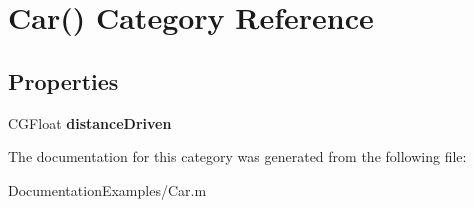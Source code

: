 \hypertarget{category_car_07_08}{}\section{Car() Category Reference}
\label{category_car_07_08}
\subsection*{Properties}
\begin{DoxyCompactItemize}
\item 
\hypertarget{category_car_07_08_a2d6e4a02390f7c55946ced5318b3a4b2}{}C\+G\+Float {\bfseries distance\+Driven}\label{category_car_07_08_a2d6e4a02390f7c55946ced5318b3a4b2}

\end{DoxyCompactItemize}


The documentation for this category was generated from the following file\+:\begin{DoxyCompactItemize}
\item 
Documentation\+Examples/Car.\+m\end{DoxyCompactItemize}
